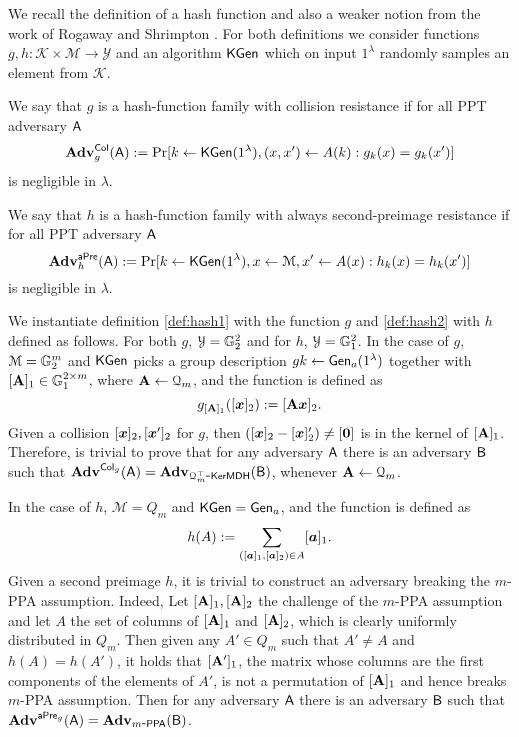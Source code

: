 
We recall the definition of a hash function and also a weaker notion from the work of Rogaway and Shrimpton \cite{FSE:RogShr04}. For both definitions we consider functions $g,h:\mathcal{K}\times\mathcal{M}\to\mathcal{Y}$ and an algorithm $\mathsf{KGen}$ which on input $1^\lambda$ randomly samples an element from $\mathcal{K}$.

\begin{definition}\label{def:hash1}
 We say that $g$ is a hash-function family with collision resistance if for all PPT adversary $\mathsf{A}$
$$
\mathbf{Adv}_g^{\mathsf{Col}}(\mathsf{A}) := \Pr[k\gets\mathsf{KGen}(1^\lambda), (x,x')\gets A(k):g_k(x)=g_k(x')]
$$ 
is negligible in $\lambda$.
\end{definition}

\begin{definition}\label{def:hash2}
 We say that $h$ is a hash-function family with always second-preimage resistance if for all PPT adversary $\mathsf{A}$
$$
\mathbf{Adv}_h^{\mathsf{aPre}}(\mathsf{A}) := \Pr[k\gets\mathsf{KGen}(1^\lambda), x\gets\mathcal{M}, x'\gets A(x):h_k(x)=h_k(x')]
$$ 
is negligible in $\lambda$.
\end{definition}

We instantiate definition \ref{def:hash1} with the function $g$ and \ref{def:hash2}  with $h$ defined as follows. For both $g$, $\mathcal{Y}=\mathbb{G}^2_2$ and for $h$, $\mathcal{Y}=\mathbb{G}_1^2$. In the case of $g$, $\mathcal{M}=\mathbb{G}^m_2$ and $\mathsf{KGen}$ picks a group description $gk\gets\mathsf{Gen}_a(1^\lambda)$ together with $[\mathbf{{A}}]_1\in\mathbb{G}^{2\times m}_1$, where $\mathbf{{A}}\gets\mathcal{Q}_m$, and the function is defined as
$$
g_{[\mathbf{{A}}]_1}([{\boldsymbol{x}}]_2):= [\mathbf{{A}}{\boldsymbol{x}}]_2.
$$
Given a collision $[{\boldsymbol{x}}]_2,[{\boldsymbol{x}}']_2$ for $g$, then $([{\boldsymbol{x}}]_2-[{\boldsymbol{x}}]'_2)\neq [{\boldsymbol{0}}]$ is in the kernel of $[\mathbf{{A}}]_1$. Therefore, is trivial to prove that for any adversary $\mathsf{A}$ there is an adversary $\mathsf{B}$ such that $\mathbf{Adv}^{\mathsf{Col}_g}(\mathsf{A})=\mathbf{Adv}_{\mathcal{Q}_m^\top\mbox{-}\mathsf{KerMDH}}(\mathsf{B})$, whenever $\mathbf{{A}}\gets\mathcal{Q}_m$.

 In the case of $h$, $\mathcal{M}=Q_m$ and $\mathsf{KGen}=\mathsf{Gen}_a$, and the function is defined as
$$
h(A):= \sum_{([{\boldsymbol{a}}]_1,[{\boldsymbol{a}}]_2)\in A}[{\boldsymbol{a}}]_1.
$$
Given a second preimage $h$, it is trivial to construct an adversary breaking the $m$-PPA assumption. Indeed, Let $[\mathbf{{A}}]_1,[\mathbf{{A}}]_2$ the challenge of the $m$-PPA assumption and let $A$ the set of columns of $[\mathbf{{A}}]_1$ and $[\mathbf{{A}}]_2$, which is clearly uniformly distributed in $Q_m$. Then given any $A'\in Q_m$ such that $A'\neq A$ and $h(A)=h(A')$, it holds that $[\mathbf{{A}}']_1$, the matrix whose columns are the first components of the elements of $A'$, is not a permutation of $[\mathbf{{A}}]_1$ and hence breaks $m$-PPA assumption. Then for any adversary $\mathsf{A}$ there is an adversary $\mathsf{B}$ such that $\mathbf{Adv}^{\mathsf{aPre}_g}(\mathsf{A})=\mathbf{Adv}_{m\mbox{-}\mathsf{PPA}}(\mathsf{B})$.

